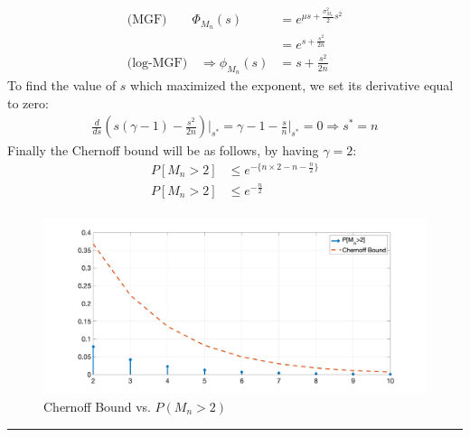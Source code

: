 \documentclass[12pt, letterpaper]{scrartcl}
\begin{document}
\begin{enumerate}[((a))]
\begin{align*}
        \textrm{(MGF)}\qquad\Phi_{M_n}(s)&=e^{\mu s+\frac{\sigma_{M_n}^2}{2}s^2}\\
        &=e^{s+\frac{s^2}{2n}}\\
        \textrm{(log-MGF)}\quad\Rightarrow\phi_{M_n}(s)&=s+\frac{s^2}{2n}
    \end{align*}
    To find the value of $s$ which maximized the exponent, we set its derivative equal to zero:
    \begin{align*}
        \frac{d}{ds}(s(\gamma-1)-\frac{s^2}{2n})\bigg\rvert_{s^*}=\gamma-1-\frac{s}{n}\bigg\rvert_{s^*}=0\Rightarrow s^*=n
    \end{align*}
    Finally the Chernoff bound will be as follows, by having $\gamma=2$:
    \begin{align*}
        P[M_n>2]&\leq e^{-\{n\times2-n-\frac{n}{2}\}}\\
        P[M_n>2]&\leq e^{-\frac{n}{2}}\\
    \end{align*}
    \begin{figure}[H]
        \includegraphics[width=0.8\linewidth]{hw2_figures/2.1b.png}
        \centering
        \caption{Chernoff Bound vs. $P(M_n>2)$}
    \end{figure}
\end{enumerate}
\hrule
\end{document}
